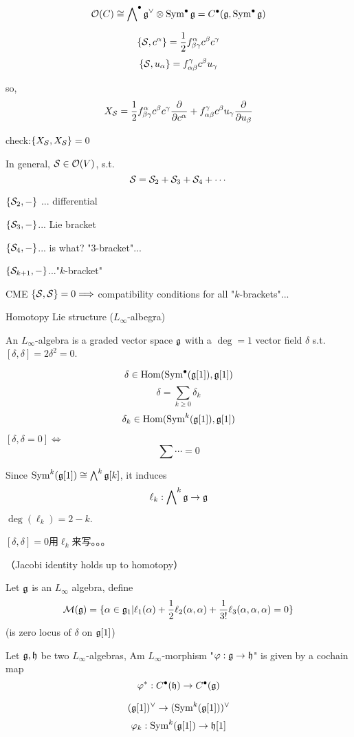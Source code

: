 $$\mathcal{O}(C)\cong \bigwedge\nolimits^{\bullet}\mathfrak{g}^\vee\otimes\operatorname{Sym}^{\bullet}\mathfrak{g}
=C^{\bullet}(\mathfrak{g},\operatorname{Sym}^{\bullet}\mathfrak{g})
$$

$$\{\mathcal{S},c^\alpha\}=\frac{1}{2}f^\alpha_{\beta\gamma}c^\beta c^\gamma$$
$$\{\mathcal{S},u_\alpha\}=f^\gamma_{\alpha\beta}c^\beta u_\gamma$$

so,
$$X_{\mathcal{S}}=\frac{1}{2}f^\alpha_{\beta\gamma}c^\beta c^\gamma\frac{\partial } {\partial c^\alpha}
+f^\gamma_{\alpha\beta}c^\beta u_\gamma\frac{\partial } {\partial u_\beta}
$$

check:$\{X_{\mathcal{S}},X_{\mathcal{S}}\}=0$
\vs

In general, $\mathcal{S}\in\mathcal{O}(V)$, s.t.
$$\mathcal{S}=\mathcal{S}_2+\mathcal{S}_3+\mathcal{S}_4+\cdots$$

$\{\mathcal{S}_2,-\}$ ... differential

$\{\mathcal{S}_3,-\}$... Lie bracket

$\{\mathcal{S}_4,-\}$... is what? "3-bracket"...

$\{\mathcal{S}_{k+1},-\}$..."$k$-bracket"

CME $\{\mathcal{S},\mathcal{S}\}=0\Longrightarrow$ compatibility conditions for all "$k$-brackets"...

Homotopy Lie structure ($L_\infty$-albegra)

\begin{definition}
An $L_\infty$-algebra is a graded vector space $\mathfrak{g}$ with
a $\deg=1$ vector field $\delta$ s.t. $[\delta,\delta]=2\delta^2=0$.
\end{definition}
$$\delta\in\operatorname{Hom}(\operatorname{Sym}^{\bullet}(\mathfrak{g}[1]),\mathfrak{g}[1])$$
$$\delta=\sum_{k\geq 0}\delta_k$$
$$\delta_k\in\operatorname{Hom}(\operatorname{Sym}^k(\mathfrak{g}[1]),\mathfrak{g}[1])$$

$[\delta,\delta=0]\iff$
$$\sum\cdots=0$$

Since $\operatorname{Sym}^k(\mathfrak{g}[1])\cong\bigwedge\nolimits^{k}\mathfrak{g}[k]$, it induces
$$\ell_k:\bigwedge\nolimits^{k}\mathfrak{g}\to\mathfrak{g}$$
$\deg(\ell_k)=2-k$.

$[\delta,\delta]=0$用$\ell_k$来写。。。

（Jacobi identity holds up to homotopy）

Let $\mathfrak{g}$ is an $L_\infty$ algebra, define
$$\mathcal{M}(\mathfrak{g})=\{\alpha\in\mathfrak{g}_1|
\ell_1(\alpha)+\frac{1}{2}\ell_2(\alpha,\alpha)+\frac{1}{3!}\ell_3(\alpha,\alpha,\alpha)=0
\}$$
(is zero locus of $\delta$ on $\mathfrak{g}[1]$)


\begin{definition}
Let $\mathfrak{g},\mathfrak{h}$ be two $L_\infty$-algebras,
Am $L_\infty$-morphism "$\varphi:\mathfrak{g}\to\mathfrak{h}$" is given by a cochain
map
$$\varphi^*:C^{\bullet}(\mathfrak{h})\to C^{\bullet}(\mathfrak{g})$$

$$(\mathfrak{g}[1])^\vee\to(\operatorname{Sym}^k(\mathfrak{g}[1]))^\vee$$
$$\varphi_k:\operatorname{Sym}^k(\mathfrak{g}[1])\to\mathfrak{h}[1]$$

\end{definition}

